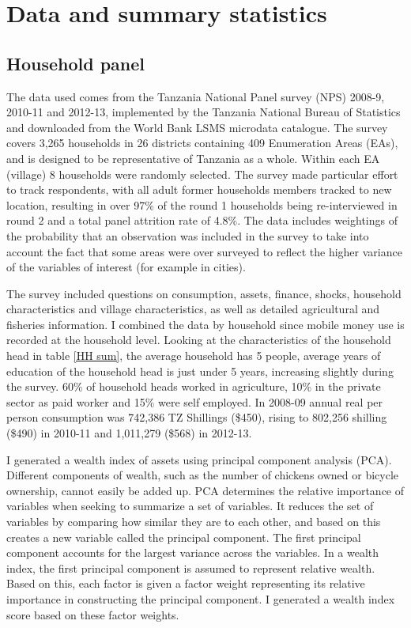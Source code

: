 \newpage
\section{Data and summary statistics}
\subsection{Household panel}
The data used comes from the Tanzania National Panel survey (NPS) 2008-9, 2010-11 and 2012-13, implemented by the Tanzania National Bureau of Statistics and downloaded from the World Bank LSMS microdata catalogue. The survey covers 3,265 households in 26 districts containing 409 Enumeration Areas (EAs), and is designed to be representative of Tanzania as a whole. Within each EA (village) 8 households were randomly selected. The survey made particular effort to track respondents, with all adult former households members tracked to new location, resulting in over 97\% of the round 1 households being re-interviewed in round 2 and a total panel attrition rate of 4.8\%. The data includes weightings of the probability that an observation was included in the survey to take into account the fact that some areas were over surveyed to reflect the higher variance of the variables of interest (for example in cities). 



The survey included questions on consumption, assets, finance, shocks, household characteristics and village characteristics, as well as detailed agricultural and fisheries information. I combined the data by household since mobile money use is recorded at the household level. Looking at the characteristics of the household head in table \ref{HH sum}, the average household has 5 people, average years of education of the household head is just under 5 years, increasing slightly during the survey. 60\% of household heads worked in agriculture, 10\% in the private sector as paid worker and 15\% were self employed. In 2008-09 annual real per person consumption was 742,386 TZ Shillings (\$450), rising to 802,256 shilling (\$490) in 2010-11 and 1,011,279 (\$568) in 2012-13. 

I generated a wealth index of assets using principal component analysis (PCA). Different components of wealth, such as the number of chickens owned or bicycle ownership, cannot easily be added up. PCA determines the relative importance of variables when seeking to summarize a set of variables. It reduces the set of variables by comparing how similar they are to each other, and based on this creates a new variable called the principal component. The first principal component accounts for the largest variance across the variables. In a wealth index, the first principal component is assumed to represent relative wealth. Based on this, each factor is given a factor weight representing its relative importance in constructing the principal component. I generated a wealth index score based on these factor weights. 


